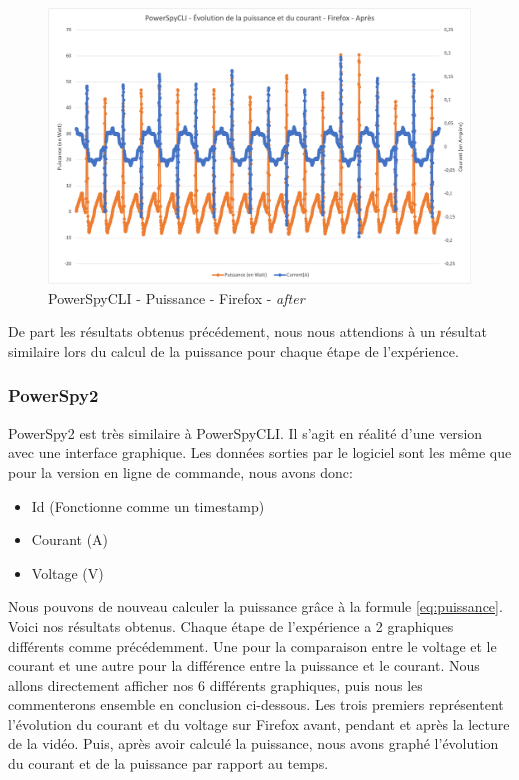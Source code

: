 \documentclass[12pt, a4paper]{report}
\begin{document}
\begin{figure}[H]
    \includegraphics[width=1\linewidth]{res//graph/PowerSpyCLI/Puissance_ff_apres.png}
    \caption{PowerSpyCLI - Puissance - Firefox - \textit{after}}
    \label{fig:pscli_power_ff_after}
\end{figure}
De part les résultats obtenus précédement, nous nous attendions à un résultat similaire lors du calcul de la puissance pour chaque étape de l'expérience. 

\subsubsection{PowerSpy2}
PowerSpy2 est très similaire à PowerSpyCLI. Il s'agit en réalité d'une version avec une interface graphique. Les données sorties par le logiciel sont les même que pour la version en ligne de commande, nous avons donc: 
\begin{itemize}
    \item Id (Fonctionne comme un timestamp)
    \item Courant (A)
    \item Voltage (V)
\end{itemize}

Nous pouvons de nouveau calculer la puissance grâce à la formule \ref{eq:puissance}. Voici nos résultats obtenus. Chaque étape de l'expérience a 2 graphiques différents comme précédemment. Une pour la comparaison entre le voltage et le courant et une autre pour la différence entre la puissance et le courant.
Nous allons directement afficher nos 6 différents graphiques, puis nous les commenterons ensemble en conclusion ci-dessous. Les trois premiers représentent l'évolution du courant et du voltage sur Firefox avant, pendant et après la lecture de la vidéo.
Puis, après avoir calculé la puissance, nous avons graphé l'évolution du courant et de la puissance par rapport au temps. 
\end{document}

